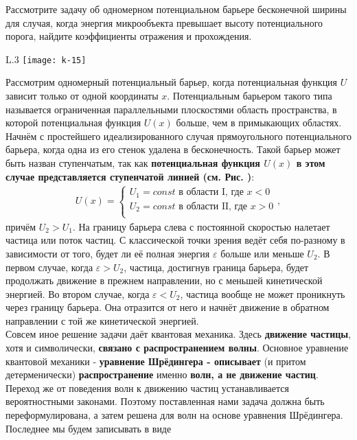 \documentclass[__main__.tex]{subfiles}
\begin{document}
Рассмотрите задачу об одномерном потенциальном барьере бесконечной ширины для случая, когда энергия микрообъекта превышает высоту потенциального порога, найдите коэффициенты отражения и прохождения.\\

\begin{wrapfigure}{L}{.3\linewidth}
    \texttt{[image: k-15]}
    \caption{}
\end{wrapfigure}
Рассмотрим одномерный потенциальный барьер, когда потенциальная функция $U$ зависит только от одной координаты $x$. Потенциальным барьером такого типа называется ограниченная параллельными плоскостями область пространства, в которой потенциальная функция $U(x)$ больше, чем в примыкающих областях.\\
Начнём с простейшего идеализированного случая прямоугольного потенциального барьера, когда одна из его стенок удалена в бесконечность. Такой барьер может быть назван ступенчатым, так как \textbf{потенциальная функция $U(x)$ в этом случае представляется ступенчатой линией (см. Рис. )}:
\begin{gather}
    U(x) =
    \begin{cases}
        U_1 = const\text{ в области I, где }x<0  \\
        U_2 = const\text{ в области II, где }x>0 \\
    \end{cases},
\end{gather}
причём $U_2>U_1$. На границу барьера слева с постоянной скоростью налетает частица или поток частиц. С классической точки зрения ведёт себя по-разному в зависимости от того, будет ли её полная энергия $\mathbb{\varepsilon}$ больше или меньше $U_2$. В первом случае, когда $\mathcal{\varepsilon}>U_2$, частица, достигнув граница барьера, будет продолжать движение в прежнем направлении, но с меньшей кинетической энергией. Во втором случае, когда $\varepsilon < U_2$, частица вообще не может проникнуть через границу барьера. Она отразится от него и начнёт движение в обратном направлении с той же кинетической энергией.\\
Совсем иное решение задачи даёт квантовая механика. Здесь \textbf{движение частицы}, хотя и символически, \textbf{связано с распространением волны}. Основное уравнение квантовой механики - \textbf{уравнение Шрёдингера - описывает} (и притом детерменически) \textbf{распространение} именно \textbf{волн, а не движение частиц}. Переход же от поведения волн к движению частиц устанавливается вероятностными законами. Поэтому поставленная нами задача должна быть переформулирована, а затем решена для волн на основе уравнения Шрёдингера. Последнее мы будем записывать в виде
\end{document}
